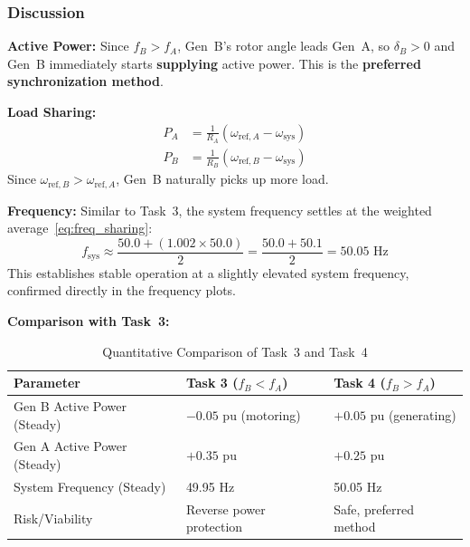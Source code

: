 \documentclass[12pt, a4paper]{article}
\begin{document}
\subsubsection{Discussion}

\textbf{Active Power:}
Since $f_B > f_A$, Gen~B's rotor angle leads Gen~A, so $\delta_B > 0$ and Gen~B immediately starts \textbf{supplying} active power. This is the \textbf{preferred synchronization method}.

\textbf{Load Sharing:}
\begin{align}
    P_A &= \frac{1}{R_A}(\omega_{\text{ref},A} - \omega_{\text{sys}}) \\
    P_B &= \frac{1}{R_B}(\omega_{\text{ref},B} - \omega_{\text{sys}})
\end{align}
Since $\omega_{\text{ref},B} > \omega_{\text{ref},A}$, Gen~B naturally picks up more load.

\textbf{Frequency:}
Similar to Task~3, the system frequency settles at the weighted average~\eqref{eq:freq_sharing}:
\begin{equation}
    f_{\text{sys}} \approx \frac{50.0 + (1.002 \times 50.0)}{2} = \frac{50.0 + 50.1}{2} = 50.05\text{ Hz}
\end{equation}
This establishes stable operation at a slightly elevated system frequency, confirmed directly in the frequency plots.

\textbf{Comparison with Task~3:}
\begin{table}[H]
    \centering
    \caption{Quantitative Comparison of Task~3 and Task~4}
    \begin{tabular}{lll}
        \toprule
        \textbf{Parameter} & \textbf{Task 3 ($f_B < f_A$)} & \textbf{Task 4 ($f_B > f_A$)} \\
        \midrule
        Gen B Active Power (Steady) & $-0.05$ pu (motoring)      & $+0.05$ pu (generating) \\
        Gen A Active Power (Steady) & $+0.35$ pu                 & $+0.25$ pu \\
        System Frequency (Steady)   & 49.95 Hz                   & 50.05 Hz \\
        Risk/Viability              & Reverse power protection   & Safe, preferred method \\
        \bottomrule
    \end{tabular}
    \label{tab:task34_comparison}
\end{table}

\newpage

\end{document}
